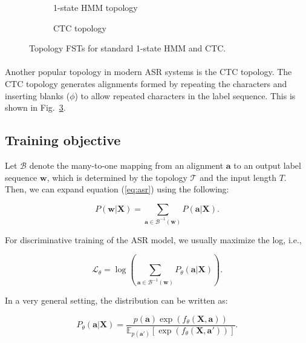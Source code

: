 \begin{figure}[t]
\begin{subfigure}{0.45\linewidth}
\centering
\resizebox{\textwidth}{!}{%

}
\caption{1-state HMM topology}
\label{fig:hmm_topo}
\end{subfigure}
\begin{subfigure}{0.55\linewidth}
\centering
\resizebox{\textwidth}{!}{%

}
\caption{CTC topology}
\label{fig:ctc_topo}
\end{subfigure}
\caption{Topology FSTs for standard 1-state HMM and CTC.}
\end{figure}

\paragraph{} Another popular topology in modern ASR systems is the CTC topology. 
%
The CTC topology generates alignments formed by repeating the characters and inserting blanks ($\phi$) to allow repeated characters in the label sequence. 
%
This is shown in Fig.~\ref{fig:ctc_topo}.

\subsection{Training objective}

Let $\mathcal{B}$ denote the many-to-one mapping from an alignment $\mathbf{a}$ to an output label sequence $\mathbf{w}$, which is determined by the topology $\mathcal{T}$ and the input length $T$. Then, we can expand equation (\ref{eq:asr}) using the following:

\begin{equation}
    P(\mathbf{w}|\mathbf{X}) = \sum_{\mathbf{a}\in \mathcal{B}^{-1}(\mathbf{w})} P(\mathbf{a}|\mathbf{X}).
\end{equation}

For discriminative training of the ASR model, we usually maximize the log, i.e.,

\begin{equation}
    \mathcal{L}_{\theta} = \log \left( \sum_{\mathbf{a}\in \mathcal{B}^{-1}(\mathbf{w})} P_{\theta}(\mathbf{a}|\mathbf{X}) \right).
\end{equation}

In a very general setting, the distribution can be written as:

\begin{equation}
    P_{\theta}(\mathbf{a}|\mathbf{X}) = \frac{p(\mathbf{a})\exp(f_{\theta}(\mathbf{X},\mathbf{a}))}{\mathbb{E}_{p(\mathbf{a'})}[\exp(f_{\theta}(\mathbf{X},\mathbf{a'}))]}.
\end{equation}

